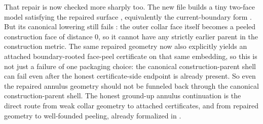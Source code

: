 \documentclass[11pt]{article}
\begin{document}
That repair is now checked more sharply too.  The new file
 builds a tiny
two-face model  satisfying the
repaired surface
, equivalently the
current-boundary form .  But its canonical
lowering
 still fails
: the outer collar face itself becomes a peeled
construction face of distance \(0\), so it cannot have any strictly earlier
parent in the construction metric.  The same repaired geometry now also
explicitly yields an attached boundary-rooted face-peel certificate on that
same embedding, so this is not just a failure of one packaging choice: the
canonical construction-parent shell can fail even after the honest
certificate-side endpoint is already present.  So even the repaired annulus
geometry should not be funneled back through the canonical
construction-parent shell.  The honest ground-up annulus continuation is the
direct route from weak collar geometry to attached certificates, and from
repaired geometry to well-founded peeling, already formalized in
.
\end{document}

